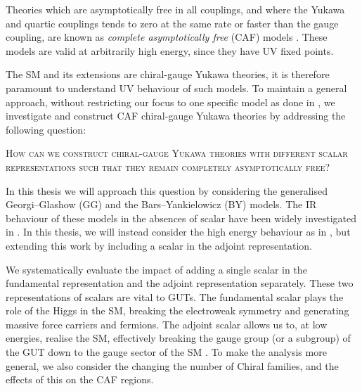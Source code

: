 Theories which are asymptotically free in all couplings, and where the Yukawa and quartic couplings tends to zero at the same rate or faster than the gauge coupling, are known as \textit{complete asymptotically free} (CAF) models \cite{Cheng:1973nv,Gross:1973ju,Holdom_2015,Giudice:2014tma,Pica:2016krb,Callaway:1988ya,Hansen:2017pwe,Zimmermann:1984sx}. These models are valid at arbitrarily high energy, since they have UV fixed points. 

The SM and its extensions are chiral-gauge Yukawa theories, it is therefore paramount to understand UV behaviour of such models. To maintain a general approach, without restricting our focus to one specific model as done in \cite{Giudice:2014tma}, we investigate and construct CAF chiral-gauge Yukawa theories by addressing the following question:

\begin{mdframed}[style=thesisbox]
    \begin{center}
        {\large\textsc{How can we construct chiral-gauge Yukawa theories with different scalar representations such that they remain completely asymptotically free?}}
    \end{center}
\end{mdframed}

In this thesis we will approach this question by considering the generalised Georgi--Glashow (GG)\cite{Georgi:1974sy,Georgi:1974yf} and the Bars--Yankielowicz (BY) \cite{Bars:1981se} models. The IR behaviour of these models in the absences of scalar have been widely investigated in \cite{Appelquist:2000qg,Bolognesi:2020mpe,Csaki:2021xhi,Bolognesi:2021yni,Bolognesi:2021hmg,Bai:2021tgl,Bolognesi:2023xxv,Li:2025tvu,Li:2026ayh}. In this thesis, we will instead consider the high energy behaviour as in \cite{Molgaard:2016bqf}, but extending this work by including a scalar in the adjoint representation. 

We systematically evaluate the impact of adding a single scalar in the fundamental representation and the adjoint representation separately. These two representations of scalars are vital to GUTs. The fundamental scalar plays the role of the Higgs in the SM, breaking the electroweak symmetry and generating massive force carriers and fermions. The adjoint scalar allows us to, at low energies, realise the SM, effectively breaking the gauge group (or a subgroup) of the GUT down to the gauge sector of the SM \cite{Georgi:1974yf, Li:1973mq}. To make the analysis more general, we also consider the changing the number of Chiral families, and the effects of this on the CAF regions. 

